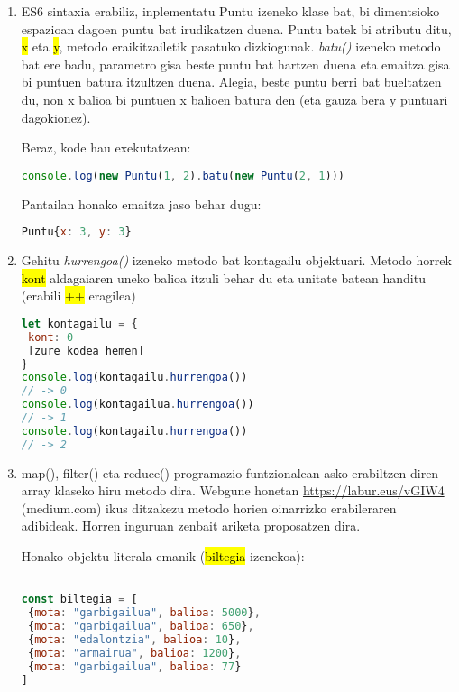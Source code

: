 \index{=>}
\begin{enumerate}
\item ES6 sintaxia erabiliz, inplementatu Puntu izeneko klase bat, bi dimentsioko espazioan dagoen puntu bat irudikatzen duena. Puntu batek bi atributu ditu, \hl{x} eta \hl{y}, metodo eraikitzailetik pasatuko dizkiogunak. \textit{batu()} izeneko metodo bat ere badu, parametro gisa beste puntu bat hartzen duena eta emaitza gisa bi puntuen batura itzultzen duena. Alegia, beste puntu berri bat bueltatzen du, non x balioa bi puntuen x balioen batura den (eta gauza bera y puntuari dagokionez).

Beraz, kode hau exekutatzean: 

\begin{lstlisting}[language=JavaScript, numbers=none]
console.log(new Puntu(1, 2).batu(new Puntu(2, 1)))
\end{lstlisting}

Pantailan honako emaitza jaso behar dugu:
\begin{lstlisting}[language=JavaScript, numbers=none]
Puntu{x: 3, y: 3}
\end{lstlisting}

\item Gehitu \textit{hurrengoa()} izeneko metodo bat kontagailu objektuari. Metodo horrek \hl{kont} aldagaiaren uneko balioa itzuli behar du eta unitate batean handitu (erabili \hl{++} eragilea)
\begin{lstlisting}[language=JavaScript, numbers=none]
let kontagailu = {
 kont: 0
 [zure kodea hemen]
}
console.log(kontagailu.hurrengoa())
// -> 0
console.log(kontagailua.hurrengoa())
// -> 1
console.log(kontagailu.hurrengoa())
// -> 2
\end{lstlisting}

\item 
{}
map(), filter() eta reduce() programazio funtzionalean asko erabiltzen diren array klaseko hiru metodo dira. Webgune honetan \href{https://medium.com/poka-techblog/simplify-your-javascript-use-map-reduce-and-filter-bd02c593cc2d}{https://labur.eus/vGIW4} (medium.com) ikus ditzakezu metodo horien oinarrizko erabileraren adibideak. Horren inguruan zenbait ariketa proposatzen dira.

Honako objektu literala emanik (\hl{biltegia} izenekoa):
\begin{lstlisting}[language=JavaScript, numbers=none]

const biltegia = [
 {mota: "garbigailua", balioa: 5000},
 {mota: "garbigailua", balioa: 650},
 {mota: "edalontzia", balioa: 10},
 {mota: "armairua", balioa: 1200},
 {mota: "garbigailua", balioa: 77}
]


\end{lstlisting}
\end{enumerate}
